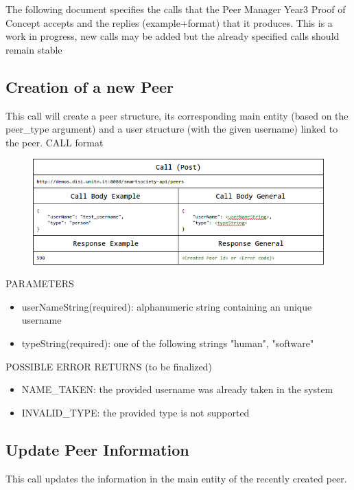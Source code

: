 The following document specifies the calls that the Peer Manager Year3 Proof of Concept accepts and the replies (example+format) that it produces.
This is a work in progress, new calls may be added but the already specified calls should remain stable

\subsection{Creation of a new Peer}
This call will create a peer structure, its corresponding main entity (based on the peer\_type argument) and a user structure (with the given username) linked to the peer. 
CALL format

\begin{figure}[htb!]
\centering
\includegraphics[width=1\linewidth]{figures/abs-new-peer.png}
\label{fig:abs-new-peer}
\end{figure}

PARAMETERS
\begin{itemize}
	\item userNameString(required): alphanumeric string containing an unique username
	\item typeString(required): one of the following strings "human", "software"
\end{itemize}

POSSIBLE ERROR RETURNS (to be finalized)
\begin{itemize}
	\item NAME\_TAKEN: the provided username was already taken in the system
	\item INVALID\_TYPE: the provided type is not supported
\end{itemize}

\subsection{Update Peer Information}
This call updates the information in the main entity of the recently created peer.

